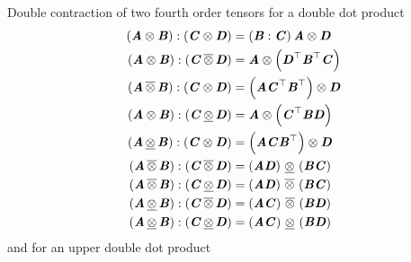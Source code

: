 Double contraction of two fourth order tensors for a double dot product
\begin{align}
   \left(  \boldsymbol{\mathit{A}} \otimes \boldsymbol{\mathit{B}}  \right) : \left(  \boldsymbol{\mathit{C}} \otimes \boldsymbol{\mathit{D}}  \right) &= \left(  \boldsymbol{\mathit{B}} : \boldsymbol{\mathit{C}}  \right)\boldsymbol{\mathit{A}} \otimes \boldsymbol{\mathit{D}} \\
   \left(  \boldsymbol{\mathit{A}} \otimes \boldsymbol{\mathit{B}}  \right) : \left(  \boldsymbol{\mathit{C}} \, \overline{\otimes} \, \boldsymbol{\mathit{D}}  \right) &= \boldsymbol{\mathit{A}} \otimes \left(  {\boldsymbol{\mathit{D}}}^{ \top }  {\boldsymbol{\mathit{B}}}^{ \top } \boldsymbol{\mathit{C}} \right) \\
   \left(  \boldsymbol{\mathit{A}} \, \overline{\otimes} \, \boldsymbol{\mathit{B}}  \right) : \left(  \boldsymbol{\mathit{C}} \otimes \boldsymbol{\mathit{D}}  \right) &= \left( \boldsymbol{\mathit{A}} {\boldsymbol{\mathit{C}}}^{ \top }  {\boldsymbol{\mathit{B}}}^{ \top }  \right) \otimes \boldsymbol{\mathit{D}} \\
   \left(  \boldsymbol{\mathit{A}} \otimes \boldsymbol{\mathit{B}}  \right) : \left(  \boldsymbol{\mathit{C}} \, \underline{\otimes} \, \boldsymbol{\mathit{D}}  \right) &= \boldsymbol{\mathit{A}} \otimes \left(  {\boldsymbol{\mathit{C}}}^{ \top } \boldsymbol{\mathit{B}}\boldsymbol{\mathit{D}} \right) \\
   \left(  \boldsymbol{\mathit{A}} \, \underline{\otimes} \, \boldsymbol{\mathit{B}}  \right) : \left(  \boldsymbol{\mathit{C}} \otimes \boldsymbol{\mathit{D}}  \right) &= \left( \boldsymbol{\mathit{A}}\boldsymbol{\mathit{C}} {\boldsymbol{\mathit{B}}}^{ \top }  \right) \otimes \boldsymbol{\mathit{D}} \\
   \left(  \boldsymbol{\mathit{A}} \, \overline{\otimes} \, \boldsymbol{\mathit{B}}  \right) : \left(  \boldsymbol{\mathit{C}} \, \overline{\otimes} \, \boldsymbol{\mathit{D}}  \right) &= \left( \boldsymbol{\mathit{A}}\boldsymbol{\mathit{D}} \right) \, \underline{\otimes} \, \left( \boldsymbol{\mathit{B}}\boldsymbol{\mathit{C}} \right) \\
   \left(  \boldsymbol{\mathit{A}} \, \overline{\otimes} \, \boldsymbol{\mathit{B}}  \right) : \left(  \boldsymbol{\mathit{C}} \, \underline{\otimes} \, \boldsymbol{\mathit{D}}  \right) &= \left( \boldsymbol{\mathit{A}}\boldsymbol{\mathit{D}} \right) \, \overline{\otimes} \, \left( \boldsymbol{\mathit{B}}\boldsymbol{\mathit{C}} \right) \\
   \left(  \boldsymbol{\mathit{A}} \, \underline{\otimes} \, \boldsymbol{\mathit{B}}  \right) : \left(  \boldsymbol{\mathit{C}} \, \overline{\otimes} \, \boldsymbol{\mathit{D}}  \right) &= \left( \boldsymbol{\mathit{A}}\boldsymbol{\mathit{C}} \right) \, \overline{\otimes} \, \left( \boldsymbol{\mathit{B}}\boldsymbol{\mathit{D}} \right) \\
   \left(  \boldsymbol{\mathit{A}} \, \underline{\otimes} \, \boldsymbol{\mathit{B}}  \right) : \left(  \boldsymbol{\mathit{C}} \, \underline{\otimes} \, \boldsymbol{\mathit{D}}  \right) &= \left( \boldsymbol{\mathit{A}}\boldsymbol{\mathit{C}} \right) \, \underline{\otimes} \, \left( \boldsymbol{\mathit{B}}\boldsymbol{\mathit{D}} \right) 
\end{align}
and for an upper double dot product
